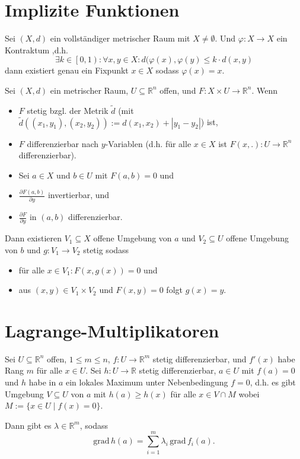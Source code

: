 \documentclass[]{scrartcl}
\newcommand{\R}{\ensuremath{\mathbb{R}}}
\newcommand{\grad}{\text{grad}}
\begin{document}
\section*{Implizite Funktionen}

\begin{satz}
Sei $(X,d)$ ein vollst\"andiger metrischer Raum mit $X\neq\emptyset$. Und $\varphi\colon X\to X$ ein Kontraktum ,d.h. \[\exists k\in\left[0,1\right)\colon\forall x,y\in X\colon  d(\varphi(x),\varphi(y)\leq k\cdot d(x,y)\]
dann existiert genau ein Fixpunkt $x\in X$ sodass $\varphi(x)=x$.
\end{satz}

\begin{satz}[1. Auflösunssatz]
Sei $(X,d)$ ein metrischer Raum, $U\subseteq\R^n$ offen, und $F\colon X\times U\to\R^n$.
Wenn
\begin{itemize}
\item $F$ stetig bzgl. der Metrik $\tilde{d}$ (mit $\tilde{d}((x_1,y_1),(x_2,y_2)):=d(x_1,x_2)+|y_1-y_2|$) ist,
\item $F$ differenzierbar nach $y$-Variablen (d.h. f\"ur alle $x\in X$ ist $F(x,.)\colon U\to\R^n$ differenzierbar).
\item Sei $a\in X$ und $b\in U$ mit $F(a,b)=0$ und
\item $\frac{\partial F(a,b)}{\partial y}$ invertierbar, und
\item $\frac{\partial F}{\partial y}$ in $(a,b)$ differenzierbar.
\end{itemize} 

Dann existieren $V_1\subseteq X$ offene Umgebung von $a$ und $V_2\subseteq U$ offene Umgebung von $b$ und $g\colon V_1\to V_2$ stetig sodass
\begin{itemize}
\item f\"ur alle $x\in V_1\colon F(x,g(x))=0$ und
\item aus $(x,y)\in V_1\times V_2$ und $F(x,y)=0$ folgt $g(x)=y$.
\end{itemize}
\end{satz}

\section*{Lagrange-Multiplikatoren}
Sei $U\subseteq\R^n$ offen, $1\leq m\leq n$, $f\colon U\to\R^m$ stetig differenzierbar, und $f'(x)$ habe Rang $m$ f\"ur alle $x\in U$. Sei $h\colon U\to\R$ stetig differenzierbar, $a\in U$ mit $f(a)=0$ und $h$ habe in $a$ ein lokales Maximum unter Nebenbedingung $f=0$, d.h. es gibt Umgebung $V\subseteq U$ von $a$ mit $h(a)\geq h(x)$ f\"ur alle $x\in V\cap M$ wobei $M:=\{x\in U\mid f(x)=0\}$.

Dann gibt es $\lambda\in\R^m$, sodass
\[\grad\,h(a)=\sum\limits^m_{i=1}\lambda_i\,\grad\,f_i(a).\]
\end{document}
